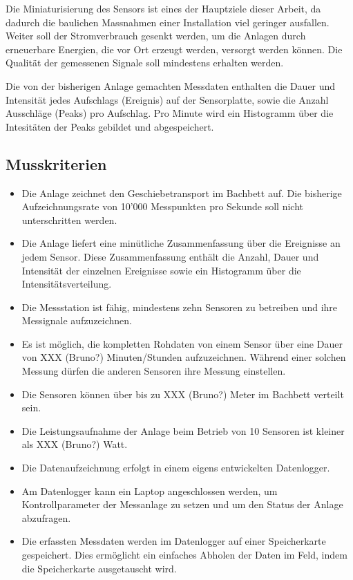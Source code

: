 Die Miniaturisierung des Sensors ist eines der Hauptziele dieser Arbeit, da dadurch die baulichen Massnahmen einer Installation viel geringer ausfallen. Weiter soll der Stromverbrauch gesenkt werden, um die Anlagen durch erneuerbare Energien, die vor Ort erzeugt werden, versorgt werden können. Die Qualität der gemessenen Signale soll mindestens erhalten werden.

Die von der bisherigen Anlage gemachten Messdaten enthalten die Dauer und Intensität jedes Aufschlags (Ereignis) auf der Sensorplatte, sowie die Anzahl Ausschläge (Peaks) pro Aufschlag. Pro Minute wird ein Histogramm über die Intesitäten der Peaks gebildet und abgespeichert.

\subsection{Musskriterien}
\begin{itemize}
\item Die Anlage zeichnet den Geschiebetransport im Bachbett auf. Die bisherige Aufzeichnungsrate von 10'000 Messpunkten pro Sekunde soll nicht unterschritten werden.
\item Die Anlage liefert eine minütliche Zusammenfassung über die Ereignisse an jedem Sensor. Diese Zusammenfassung enthält die Anzahl, Dauer und Intensität der einzelnen Ereignisse sowie ein Histogramm über die Intensitätsverteilung.
\item Die Messstation ist fähig, mindestens zehn Sensoren zu betreiben und ihre Messignale aufzuzeichnen.
\item Es ist möglich, die kompletten Rohdaten von einem Sensor über eine Dauer von XXX (Bruno?) Minuten/Stunden aufzuzeichnen. Während einer solchen Messung dürfen die anderen Sensoren ihre Messung einstellen.
\item Die Sensoren können über bis zu XXX (Bruno?) Meter im Bachbett verteilt sein.
\item Die Leistungsaufnahme der Anlage beim Betrieb von 10 Sensoren ist kleiner als XXX (Bruno?) Watt.
\item Die Datenaufzeichnung erfolgt in einem eigens entwickelten Datenlogger.
\item Am Datenlogger kann ein Laptop angeschlossen werden, um Kontrollparameter der Messanlage zu setzen und um den Status der Anlage abzufragen.
\item Die erfassten Messdaten werden im Datenlogger auf einer Speicherkarte gespeichert. Dies ermöglicht ein einfaches Abholen der Daten im Feld, indem die Speicherkarte ausgetauscht wird.
\end{itemize}
